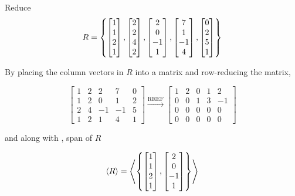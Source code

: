 \documentclass[a4paper,12pt]{article}
\begin{document}
\begin{exm}
  Reduce $$R=\left\{ \begin{bmatrix}
    1\\
    1\\
    2\\
    1
  \end{bmatrix},\begin{bmatrix}
    2\\
    2\\
    4\\
    2
  \end{bmatrix},\begin{bmatrix}
    2\\
    0\\
    -1\\
    1
  \end{bmatrix},\begin{bmatrix}
    7\\
    1\\
    -1\\
    4
  \end{bmatrix},\begin{bmatrix}
    0\\
    2\\
    5\\
    1
  \end{bmatrix}\right\}$$\s

  \ans By placing the column vectors in $R$ into a matrix and row-reducing the matrix,

  $$\begin{bmatrix}
    1 & 2 & 2 & 7 & 0\\
    1 & 2 & 0 & 1 & 2\\
    2 & 4 & -1 & -1 & 5\\
    1 & 2 & 1 & 4 & 1
  \end{bmatrix}\xrightarrow[ ]{\text{RREF}}\begin{bmatrix}
    1 & 2 & 0 & 1 & 2\\
    0 & 0 & 1 & 3 & -1\\
    0 & 0 & 0 & 0 & 0\\
    0 & 0 & 0 & 0 & 0
  \end{bmatrix}$$\s

  and along with \rthm[\sctd{1}], span of $R$

  $$\left\langle R\right\rangle=\left\langle \left\{ \begin{bmatrix}
    1\\
    1\\
    2\\
    1
  \end{bmatrix},\begin{bmatrix}
    2\\
    0\\
    -1\\
    1
  \end{bmatrix}\right\}\right\rangle$$
\end{exm}\n
\end{document}
